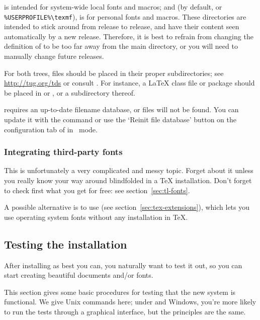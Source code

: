 \documentclass{article}
\begin{document}
is intended for system-wide local fonts and macros; and
 (by default,  or
\verb|%USERPROFILE%\texmf|), is for personal fonts and macros.  These
directories are intended to stick around from release to release, and
have their content seen automatically by a new \TL{} release.
Therefore, it is best to refrain from changing the definition of
 to be too far away from the main \TL{} directory,
or you will need to manually change future releases.

For both trees, files should be placed in their proper subdirectories;
see \url{http://tug.org/tds} or consult
. For instance, a \LaTeX{} class file or
package should be placed in  or
, or a subdirectory thereof.

 requires an up-to-date filename database, or files
will not be found.  You can update it with the command
 or use the `Reinit file database' button on the
configuration tab of  in \GUI\ mode.

\subsubsection{Integrating third-party fonts}

This is unfortunately a very complicated and messy topic. Forget
about it unless you really know your way around blindfolded in a
\TeX{} installation. Don't forget to check first what you get for
free: see section~\ref{sec:tl-fonts}.

A possible alternative is to use \XeTeX (see
section~\ref{sec:tex-extensions}), which lets you use operating system
fonts without any installation in \TeX.


\subsection{Testing the installation}
\label{sec:test-install}

After installing \TL{} as best you can, you naturally want to test
it out, so you can start creating beautiful documents and\slash or fonts.

This section gives some basic procedures for testing that the new system
is functional.  We give Unix commands here; under \MacOSX{} and Windows,
you're more likely to run the tests through a graphical interface, but
the principles are the same.
\end{document}
